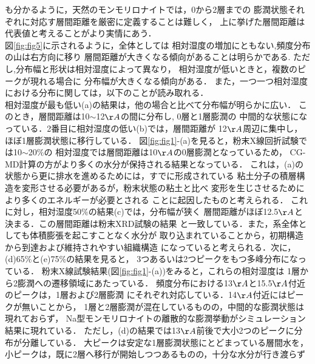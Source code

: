 も分かるように，天然のモンモリロナイトでは，0から2層までの
膨潤状態それぞれに対応す層間距離を厳密に定義することは難しく，
上に挙げた層間距離は代表値と考えることがより実情にあう．\\
\hspace{\parindent}
図\ref{fig:fig5}に示されるように，全体としては
相対湿度の増加にともない,頻度分布の山は右方向に移り
層間距離が大きくなる傾向があることは明らかである.
ただし,分布幅と形状は相対湿度によって異なり，
相対湿度が低いときと，複数のピークが現れる場合に
分布幅が大きくなる傾向がある．
また，一つ一つ相対湿度における分布に関しては，以下のことが読み取れる．\\
\hspace{\parindent}
相対湿度が最も低い(a)の結果は，他の場合と比べて分布幅が明らかに広い．
このとき，層間距離は10$\sim$12$\AA$の間に分布し, 0層と1層膨潤の
中間的な状態になっている．2番目に相対湿度の低い(b)では，層間距離が
12$\AA$周辺に集中し，ほぼ1層膨潤状態に移行している．
図\ref{fig:fig1}-(a)を見ると，粉末X線回折試験では10$\sim$20$\%$の
相対湿度では層間距離は10$\AA$の0層膨潤となっているため，
CG-MD計算の方がより多くの水分が保持される結果となっている．
これは，(a)の状態から更に排水を進めるためには，すでに形成されている
粘土分子の積層構造を変形させる必要があるが，粉末状態の粘土と比べ
変形を生じさせるためにより多くのエネルギーが必要とされる
ことに起因したものと考えられる．
これに対し，相対湿度50$\%$の結果(c)では，分布幅が狭く
層間距離がほぼ12.5$\AA$と決まる．この層間距離は粉末XRD試験の結果
と一致している．また，系全体としても体積膨張を起こすことなく水分が
取り込まれていることから，初期構造から到達および維持されやすい組織構造
になっていると考えられる．次に，(d)65$\%$と(e)75$\%$の結果を見ると，
3つあるいは2つピークをもつ多峰分布になっている．
粉末X線試験結果(図\ref{fig:fig1}-(a))をみると，これらの相対湿度は
1層から2膨潤への遷移領域にあたっている．
頻度分布における13$\AA$と15.5$\AA$付近のピークは，1層および2層膨潤
にそれぞれ対応している．14$\AA$付近にはピークが無いことから，
1層と2層膨潤が混在しているものの，中間的な膨潤状態は現れておらず，
Na型モンモリロナイトの離散的な膨潤挙動がシミュレーション結果に現れている．
ただし，(d)の結果では13$\AA$前後で大小2つのピークに分布が分離している．
大ピークは安定な1層膨潤状態にとどまっている層間水を，
小ピークは，既に2層へ移行が開始しつつあるものの，十分な水分が行き渡らず
